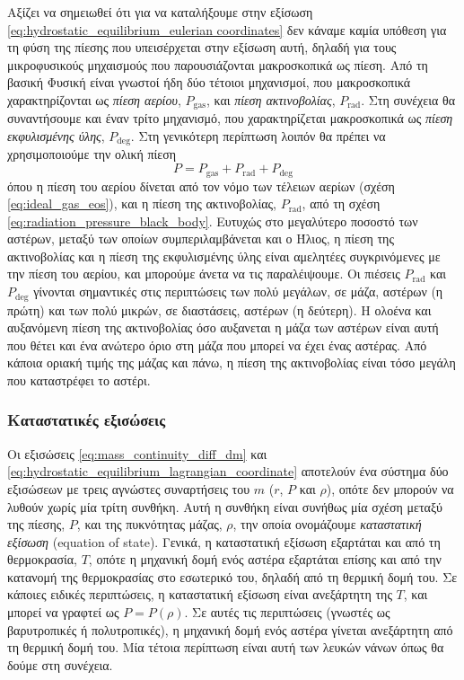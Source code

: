Αξίζει να σημειωθεί ότι για να καταλήξουμε στην εξίσωση \eqref{eq:hydrostatic_equilibrium_eulerian coordinates} δεν κάναμε καμία υπόθεση για τη φύση της πίεσης που υπεισέρχεται στην εξίσωση αυτή, δηλαδή για τους μικροφυσικούς μηχαισμούς που παρουσιάζονται μακροσκοπικά ως πίεση. Από τη βασική Φυσική είναι γνωστοί ήδη δύο τέτοιοι μηχανισμοί, που μακροσκοπικά χαρακτηρίζονται ως \textit{πίεση αερίου}, $P_{\text{gas}}$, και \textit{πίεση ακτινοβολίας}, $P_{\text{rad}}$. Στη συνέχεια θα συναντήσουμε και έναν τρίτο μηχανισμό, που χαρακτηρίζεται μακροσκοπικά ως \textit{πίεση εκφυλισμένης ύλης}, $P_{\text{deg}}$. Στη γενικότερη περίπτωση λοιπόν θα πρέπει να χρησιμοποιούμε την ολική πίεση
$$ P = P_{\text{gas}} + P_{\text{rad}} + P_{\text{deg}}$$
όπου η πίεση του αερίου δίνεται από τον νόμο των τέλειων αερίων (σχέση \eqref{eq:ideal_gas_eos}), και η πίεση της ακτινοβολίας, $P_{\text{rad}}$, από τη σχέση \eqref{eq:radiation_pressure_black_body}. Ευτυχώς στο μεγαλύτερο ποσοστό των αστέρων, μεταξύ των οποίων συμπεριλαμβάνεται και ο Ήλιος, η πίεση της ακτινοβολίας και η πίεση της εκφυλισμένης ύλης είναι αμελητέες συγκρινόμενες με την πίεση του αερίου, και μπορούμε άνετα να τις παραλέιψουμε. Οι πιέσεις $P_{\text{rad}}$ και $P_{\text{deg}}$ γίνονται σημαντικές στις περιπτώσεις των πολύ μεγάλων, σε μάζα, αστέρων (η πρώτη) και των πολύ μικρών, σε διαστάσεις, αστέρων (η δεύτερη). Η ολοένα και αυξανόμενη πίεση της ακτινοβολίας όσο αυξανεται η μάζα των αστέρων είναι αυτή που θέτει και ένα ανώτερο όριο στη μάζα που μπορεί να έχει ένας αστέρας. Από κάποια οριακή τιμής της μάζας και πάνω, η πίεση της ακτινοβολίας είναι τόσο μεγάλη που καταστρέφει το αστέρι.
\subsubsection{Καταστατικές εξισώσεις}
Οι εξισώσεις \eqref{eq:mass_continuity_diff_dm} και \eqref{eq:hydrostatic_equilibrium_lagrangian_coordinate}
αποτελούν ένα σύστημα δύο εξισώσεων με τρεις αγνώστες συναρτήσεις του $m$ ($r$, $P$ και $\rho$), οπότε δεν μπορούν να λυθούν χωρίς μία τρίτη συνθήκη. Αυτή η συνθήκη είναι συνήθως μία σχέση μεταξύ της πίεσης, $P$, και της πυκνότητας μάζας, $\rho$, την οποία ονομάζουμε \textit{καταστατική εξίσωση} (equation of state). Γενικά, η καταστατική εξίσωση εξαρτάται και από τη θερμοκρασία, $T$, οπότε η μηχανική δομή ενός αστέρα εξαρτάται επίσης και από την κατανομή της θερμοκρασίας στο εσωτερικό του, δηλαδή από τη θερμική δομή του. Σε κάποιες ειδικές περιπτώσεις, η καταστατική εξίσωση είναι ανεξάρτητη της $T$, και μπορεί να γραφτεί ως $P = P(\rho)$. Σε αυτές τις περιπτώσεις (γνωστές ως βαρυτροπικές ή πολυτροπικές), η μηχανική δομή ενός αστέρα γίνεται ανεξάρτητη από τη θερμική δομή του. Μία τέτοια περίπτωση είναι αυτή των λευκών νάνων όπως θα δούμε στη συνέχεια.

